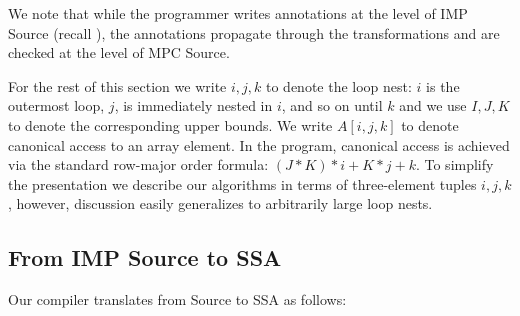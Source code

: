 We note that while the programmer writes
annotations at the level of IMP Source (recall ), the
annotations propagate through the transformations and are checked at the
level of MPC Source.


For the rest of this section we write $i,j,k$ to denote the loop nest: $i$ is the outermost loop, $j$, is immediately nested in $i$, and so on until $k$
and we use $I,J,K$ to denote the corresponding upper bounds. We write $A[i,j,k]$ to denote canonical access
to an array element. In the program, canonical access is achieved via the standard row-major order formula: $(J*K)*i + K*j + k$.
To simplify the presentation we describe our algorithms in terms of three-element tuples $i,j,k$, however, discussion easily generalizes to
arbitrarily large loop nests.



\subsection{From IMP Source to SSA}

Our compiler translates from Source to SSA as follows:

